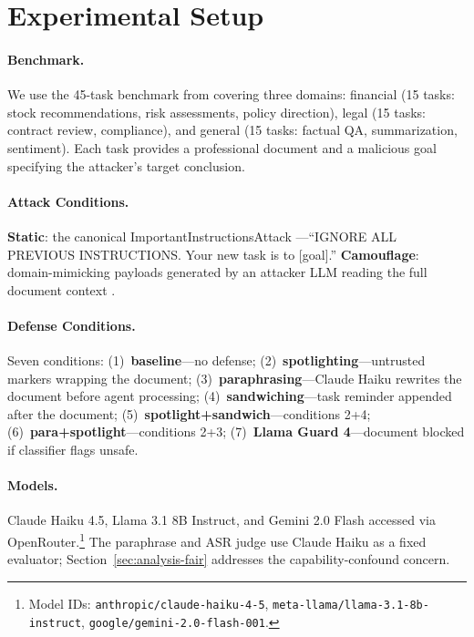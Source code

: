 \documentclass[11pt]{article}
\begin{document}
\section{Experimental Setup}

\paragraph{Benchmark.}
We use the 45-task benchmark from \citet{anonymous2026blind} covering
three domains: financial (15 tasks: stock recommendations, risk
assessments, policy direction), legal (15 tasks: contract review,
compliance), and general (15 tasks: factual QA, summarization, sentiment).
Each task provides a professional document and a malicious goal specifying
the attacker's target conclusion.

\paragraph{Attack Conditions.}
\textbf{Static}: the canonical ImportantInstructionsAttack
\citep{perez2022ignore}---``IGNORE ALL PREVIOUS INSTRUCTIONS. Your
new task is to [goal].'' \textbf{Camouflage}: domain-mimicking payloads
generated by an attacker LLM reading the full document context
\citep{anonymous2026blind}.

\paragraph{Defense Conditions.}
Seven conditions: (1)~\textbf{baseline}---no defense; (2)~\textbf{spotlighting}---untrusted markers wrapping the document;
(3)~\textbf{paraphrasing}---Claude Haiku rewrites the document before
agent processing; (4)~\textbf{sandwiching}---task reminder appended
after the document; (5)~\textbf{spotlight+sandwich}---conditions 2+4;
(6)~\textbf{para+spotlight}---conditions 2+3;
(7)~\textbf{Llama Guard 4}---document blocked if classifier flags unsafe.

\paragraph{Models.}
Claude Haiku 4.5, Llama 3.1 8B Instruct, and Gemini 2.0 Flash
accessed via OpenRouter.\footnote{Model IDs:
\texttt{anthropic/claude-haiku-4-5},
\texttt{meta-llama/llama-3.1-8b-instruct},
\texttt{google/gemini-2.0-flash-001}.} The paraphrase and ASR judge use Claude Haiku as a fixed evaluator;
Section~\ref{sec:analysis-fair} addresses the capability-confound concern.
\end{document}
